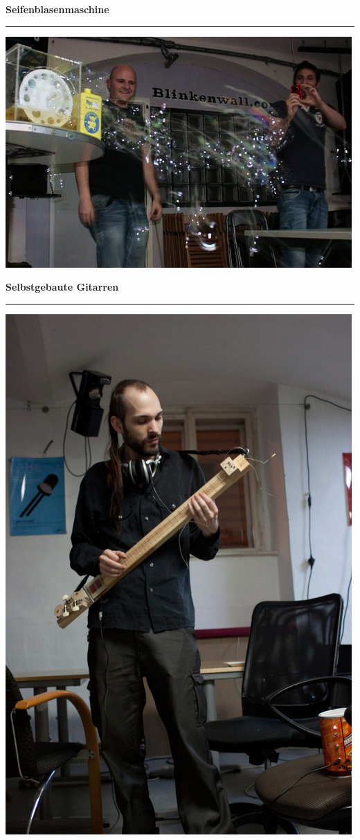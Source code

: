\documentclass{seminar}
\providecommand{\T}[1]{
	\begin{center}
		{\bf #1}
	\end{center}
	\vspace{2mm}
	\hrule
	\vspace{2mm}
}
\begin{document}
\begin{slide}
	\T{Seifenblasenmaschine}
	\begin{center}
		\includegraphics[scale=2]{bubbleomat.jpeg}
	\end{center}
\end{slide}

\begin{slide}
	\T{Selbstgebaute Gitarren}
	\begin{center}
		\includegraphics[scale=0.8]{guitars.jpeg}
	\end{center}
\end{slide}
\end{document}
